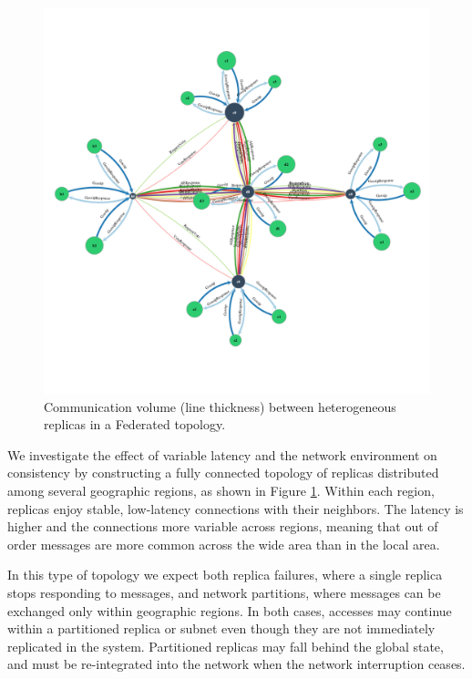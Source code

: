 \documentclass[10pt,conference,letterpaper]{IEEEtran}
\begin{document}
\begin{figure}
    \centering
      \includegraphics[width=\linewidth]{figures/federated_sync}
    \caption{Communication volume (line thickness) between  heterogeneous replicas in a Federated topology.}
    \label{fig:topology}
\end{figure}

We investigate the effect of variable latency and the network environment on consistency by
constructing a fully connected topology of replicas distributed among several
geographic regions, as shown in Figure \ref{fig:topology}.
Within each region, replicas enjoy stable, low-latency connections with their
neighbors.
The latency is higher and the connections more variable across regions, meaning that
out of order messages are more common across the wide area than in the local area.

In this type of topology we expect both replica failures, where a single
replica stops responding to messages, and network partitions, where messages
can be exchanged only within geographic regions.
In both cases, accesses may continue within a partitioned replica or subnet
even though they are not immediately replicated in the system.
Partitioned replicas may fall behind the global state, and must be
re-integrated into the network when the network interruption ceases.
\end{document}

